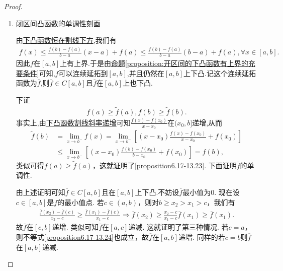 \documentclass[lang=cn,newtx,10pt,scheme=chinese]{elegantbook}
\begin{document}
\begin{proof}
\begin{enumerate}
\item {\heiti 闭区间凸函数的单调性刻画}

由\hyperref[下凸函数恒在割线下方]{下凸函数恒在割线下方},我们有
\begin{align*}
   f\left( x \right) \leqslant \frac{f\left( b \right) -f\left( a \right)}{b-a}\left( x-a \right) +f\left( a \right) \leqslant \frac{f\left( b \right) -f\left( a \right)}{b-a}\left( b-a \right) +f\left( a \right) ,\forall x\in \left[ a,b \right] .
\end{align*}
因此$f$在$[a,b]$上有上界.于是由\hyperref[proposition:开区间的下凸函数有上界的充要条件]{命题\ref{proposition:开区间的下凸函数有上界的充要条件}}可知,$f$可以连续延拓到$[a,b]$,并且仍然在$[a,b]$上下凸.记这个连续延拓函数为$\overline{f}$,则$\overline{f} \in C[a,b]$且$\overline{f}$在$[a,b]$上也下凸.

下证
\begin{align}
   f(a)\geqslant\tilde{f}(a),f(b)\geqslant\tilde{f}(b).\label{proposition6.17-13.23}
\end{align}
事实上,由\hyperref[下凸函数割线斜率递增]{下凸函数割线斜率递增}可知\(\frac{f(x)-f(x_0)}{x - x_0}\)在\((x_0,b]\)递增,从而
\begin{align*}
\tilde{f}(b)&=\lim_{x\rightarrow b^-}f(x)
=\lim_{x\rightarrow b^-}\left[(x - x_0)\frac{f(x)-f(x_0)}{x - x_0}+f(x_0)\right]\\
&\leqslant\lim_{x\rightarrow b^-}\left[(x - x_0)\frac{f(b)-f(x_0)}{b - x_0}+f(x_0)\right]
=f(b),
\end{align*}
类似可得\(f(a)\geqslant\tilde{f}(a)\)，这就证明了\eqref{proposition6.17-13.23}.
下面证明$\overline{f}$的单调性.

由上述证明可知\(\overline{f}\in C[a,b]\)且在$[a,b]$上下凸.不妨设\(\overline{f}\)最小值为\(0\). 现在设\(c\in[a,b]\)是\(f\)的最小值点. 若\(c\in(a,b)\)，则对\(b\geqslant x_2>x_1>c\)，我们有
\begin{align}
\frac{\overline{f}(x_2)-\overline{f}(c)}{x_2 - c}\geqslant\frac{\overline{f}(x_1)-\overline{f}(c)}{x_1 - c}\Rightarrow \overline{f}(x_2)\geqslant\frac{x_2 - c}{x_1 - c}\overline{f}(x_1)\geqslant \overline{f}(x_1).\label{proposition6.17-13.24} 
\end{align}
故\(\overline{f}\)在\([c,b]\)递增. 类似可知\(\overline{f}\)在\([a,c]\)递减. 这就证明了第三种情况. 若\(c = a\)，则不等式\eqref{proposition6.17-13.24}也成立，故\(\overline{f}\)在\([a,b]\)递增. 同样的若\(c = b\)则\(\overline{f}\)在\([a,b]\)递减.


\end{enumerate}
\end{proof}
\end{document}
